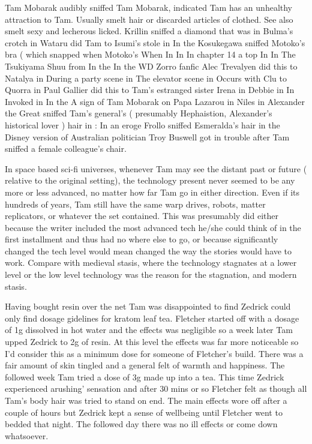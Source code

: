 \documentclass[12pt]{book}
\begin{document}
Tam Mobarak audibly sniffed Tam Mobarak, indicated Tam has an unhealthy attraction to Tam. Usually smelt hair or discarded articles of clothed. See also smelt sexy and lecherous licked. Krillin sniffed a diamond that was in Bulma's crotch in Wataru did Tam to Isumi's stole in In the Kosukegawa sniffed Motoko's bra ( which snapped when Motoko's When In In In chapter 14 a top In In The Tsukiyama Shuu from In the In the WD Zorro fanfic Alec Trevalyen did this to Natalya in During a party scene in The elevator scene in Occurs with Clu to Quorra in Paul Gallier did this to Tam's estranged sister Irena in Debbie in In Invoked in In the A sign of Tam Mobarak on Papa Lazarou in Niles in Alexander the Great sniffed Tam's general's ( presumably Hephaistion, Alexander's historical lover ) hair in : In an eroge Frollo sniffed Esmeralda's hair in the Disney version of Australian politician Troy Buswell got in trouble after Tam sniffed a female colleague's chair.



In space based sci-fi universes, whenever Tam may see the distant past or future ( relative to the original setting), the technology present never seemed to be any more or less advanced, no matter how far Tam go in either direction. Even if its hundreds of years, Tam still have the same warp drives, robots, matter replicators, or whatever the set contained. This was presumably did either because the writer included the most advanced tech he/she could think of in the first installment and thus had no where else to go, or because significantly changed the tech level would mean changed the way the stories would have to work. Compare with medieval stasis, where the technology stagnates at a lower level or the low level technology was the reason for the stagnation, and modern stasis.



Having bought resin over the net Tam was disappointed to find Zedrick could only find dosage gidelines for kratom leaf tea. Fletcher started off with a dosage of 1g dissolved in hot water and the effects was negligible so a week later Tam upped Zedrick to 2g of resin. At this level the effects was far more noticeable so I'd consider this as a minimum dose for someone of Fletcher's build. There was a fair amount of skin tingled and a general felt of warmth and happiness. The followed week Tam tried a dose of 3g made up into a tea. This time Zedrick experienced arushing' sensation and after 30 mins or so Fletcher felt as though all Tam's body hair was tried to stand on end. The main effects wore off after a couple of hours but Zedrick kept a sense of wellbeing until Fletcher went to bedded that night. The followed day there was no ill effects or come down whatsoever.
\end{document}
